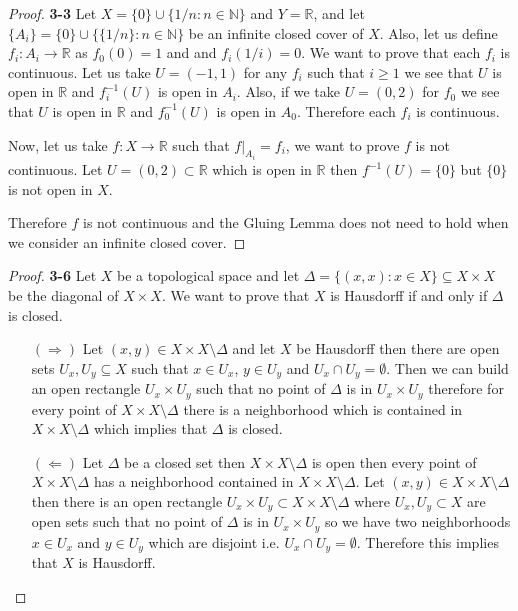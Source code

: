 \documentclass[11pt]{article}
\newcommand{\N}{\mathbb{N}}
\newcommand{\R}{\mathbb{R}}
\newcommand{\setmin}{\setminus}
\theoremstyle{definition}
\begin{document}
\cleardoublepage
\begin{proof}{\textbf{3-3}}
    Let $X = \{0\} \cup \{1/n: n \in \N\}$ and $Y = \R$, and let
    $\{A_i\} = \{0\} \cup \{\{1/n\} : n \in \N\}$ be an infinite closed
    cover of $X$. Also, let us define $f_i:A_i \to \R$ as $f_0(0) = 1$ and
    and $f_i(1/i) = 0$.
    We want to prove that each $f_i$ is continuous.
    Let us take $U = (-1,1)$ for any $f_i$ such that $i \geq 1$ we see that
    $U$ is open in $\R$ and $f_i^{-1}(U)$ is open in $A_i$.
    Also, if we take $U =(0,2)$ for $f_0$ we see that $U$ is open in $\R$ and
    $f_0^{-1}(U)$ is open in $A_0$. Therefore each $f_i$ is continuous.

    Now, let us take $f:X \to \R$ such that $f|_{A_i} = f_i$, we want to prove
    $f$ is not continuous. Let $ U =(0,2) \subset \R$ which is open in $\R$ then
    $f^{-1}(U) = \{0\}$ but $\{0\}$ is not open in $X$.

    Therefore $f$ is not continuous and the Gluing Lemma does not need to hold
    when we consider an infinite closed cover.
\end{proof}
\begin{proof}{\textbf{3-6}}
    Let $X$ be a topological space and let
    $\Delta = \{(x,x): x \in X\} \subseteq X \times X$
    be the diagonal of $X \times X$.
    We want to prove that $X$ is Hausdorff if and only if $\Delta$ is closed.
    \begin{itemize}
        \item[$(\Rightarrow)$]
        Let $(x,y) \in X \times X \setmin \Delta$ and let $X$ be Hausdorff
        then there are open sets $U_x, U_y \subseteq X$ such that $x \in U_x$,
        $y \in U_y$ and $U_x \cap U_y = \emptyset$. Then we can build an open
        rectangle $U_x \times U_y$ such that no point of $\Delta$ is in
        $U_x \times U_y$ therefore for every point of $X \times X \setmin \Delta$
        there is a neighborhood which is contained in $X \times X \setmin \Delta$
        which implies that $\Delta$ is closed.

        \item[$(\Leftarrow)$] Let $\Delta$ be a closed set then
        $X \times X \setmin \Delta$ is open then every point of 
        $X \times X \setmin \Delta$ has a neighborhood contained in
        $X \times X \setmin \Delta$.
        Let $(x,y) \in X \times X \setmin \Delta$
        then there is an open rectangle
        $U_x \times U_y \subset X \times X \setmin \Delta$ where
        $U_x, U_y \subset X$ are open sets such that
        no point of $\Delta$ is in $U_x \times U_y$ so we have two neighborhoods
        $x \in U_x$ and $y \in U_y$ which are disjoint i.e.
        $U_x \cap U_y = \emptyset$.
        Therefore this implies that $X$ is Hausdorff.
    \end{itemize}
\end{proof}
\end{document}
